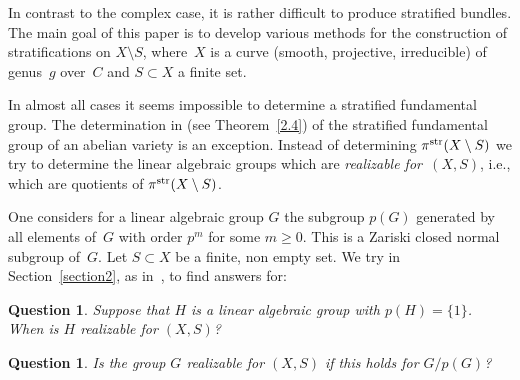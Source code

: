 \documentclass[10pt,a4paper]{amsart}
\numberwithin{equation}{section}
\newtheorem{Question}[Theorem]{Question}
{\theoremstyle{definition}
\newtheorem{Definition}[Theorem]{Definition}
\newtheorem{Example}[Theorem]{Example}
\newtheorem{Remark}[Theorem]{Remark}
\newtheorem{Remarks}[Theorem]{Remarks}
\newtheorem{Observations}[Theorem]{Obervations}
\newtheorem{Observation}[Theorem]{Observation}
\newtheorem{Examples}[Theorem]{Examples}
\newtheorem{Comments}[Theorem]{Comments}}
\begin{document}
In contrast to the complex case, it is rather difficult to produce stratified bundles. The main goal of this paper is to develop various methods for the construction of stratifications on $X\setminus S$, where~$X$ is a curve (smooth, projective, irreducible) of genus~$g$ over~$C$ and $S\subset X$ a finite set.

In almost all cases it seems impossible to determine a stratified fundamental group. The determination in \cite[Section~3]{Sa} (see Theorem~\ref{2.4}) of the stratified fundamental group of an abelian variety is an exception. Instead of determining $\pi^{\rm str}(X\setminus S)$ we try to determine the linear algebraic groups which are {\it realizable for~$(X,S)$}, i.e., which are quotients of $\pi^{\rm str}(X\setminus S)$.

 One considers for a linear algebraic group $G$ the subgroup $p(G)$ generated by all elements of~$G$ with order $p^m$ for some $m\geq 0$. This is a Zariski closed normal subgroup of~$G$. Let $S\subset X$ be a finite, non empty set. We try in Section~\ref{section2}, as in~\cite{Ma-vdP1}, to find answers for:

\begin{Question}\label{Question1} Suppose that $H$ is a linear algebraic group with $p(H)=\{1\}$. When is $H$ rea\-li\-zable for $(X,S)$?
\end{Question}

\begin{Question}\label{Question2} Is the group $G$ realizable for $(X,S)$ if this holds for $G/p(G)$?
\end{Question}
\end{document}
